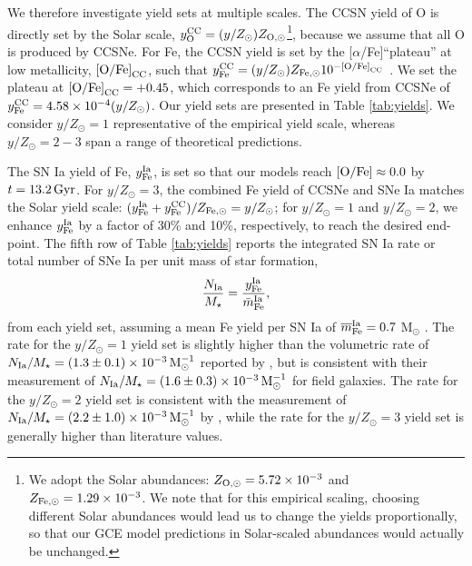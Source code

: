 \documentclass[twocolumn,twocolappendix,linenumbers]{aastex631}
\newcommand{\aFe}{[$\alpha$/Fe]\xspace}
\newcommand{\mathOFe}{{\rm [O/Fe]}}
\newcommand{\yZ}[1]{$y/Z_\odot=#1$}
\begin{document}
We therefore investigate yield sets at multiple scales. The CCSN yield of O is directly set by the Solar scale, $y_{\rm O}^{\rm CC}=(y/Z_\odot)Z_{\rm O,\odot}$\footnote{
    We adopt the \citet{asplund_chemical_2009} Solar abundances: $Z_{\rm O,\odot}=5.72\times10^{-3}$ and $Z_{\rm Fe,\odot}=1.29\times10^{-3}$. We note that for this empirical scaling, choosing different Solar abundances \citep[e.g.,][]{magg_observational_2022} would lead us to change the yields proportionally, so that our GCE model predictions in Solar-scaled abundances would actually be unchanged.
}, because we assume that all O is produced by CCSNe. For Fe, the CCSN yield is set by the \aFe ``plateau'' at low metallicity, $\mathOFe_{\rm CC}$, such that $y_{\rm Fe}^{\rm CC}=(y/Z_\odot) Z_{\rm Fe,\odot} 10^{-\mathOFe_{\rm CC}}$ \citep[for further discussion on the empirical yield scale and the CCSN plateau, see][]{weinberg_scale_2024}. We set the plateau at $\mathOFe_{\rm CC}=+0.45$, which corresponds to an Fe yield from CCSNe of $y_{\rm Fe}^{\rm CC}=4.58\times10^{-4}(y/Z_\odot)$. Our yield sets are presented in Table \ref{tab:yields}. We consider \yZ{1} representative of the empirical yield scale, whereas \yZ{2-3} span a range of theoretical predictions.

The SN Ia yield of Fe, $y_{\rm Fe}^{\rm Ia}$, is set so that our models reach $\mathOFe\approx0.0$ by $t=13.2\,{\rm Gyr}$. For \yZ{3}, the combined Fe yield of CCSNe and SNe Ia matches the Solar yield scale: $(y_{\rm Fe}^{\rm Ia}+y_{\rm Fe}^{\rm CC})/Z_{\rm Fe,\odot}=y/Z_\odot$; for \yZ{1} and \yZ{2}, we enhance $y_{\rm Fe}^{\rm Ia}$ by a factor of 30\% and 10\%, respectively, to reach the desired end-point. The fifth row of Table \ref{tab:yields} reports the integrated SN Ia rate or total number of SNe Ia per unit mass of star formation,
\begin{equation}
    \frac{N_{\rm Ia}}{M_\star} = \frac{y_{\rm Fe}^{\rm Ia}}{\bar m_{\rm Fe}^{\rm Ia}},
    \label{eq:snia-rate}
\end{equation}
from each yield set, assuming a mean Fe yield per SN Ia of $\overline m_{\rm Fe}^{\rm Ia}=0.7$ M$_\odot$ \citep{mazzali_common_2007,howell_effect_2009}. The rate for the \yZ{1} yield set is slightly higher than the volumetric rate of $N_{\rm Ia}/M_\star=(1.3\pm0.1)\times10^{-3}\,{\rm M}_\odot^{-1}$ reported by \citet{maoz_star_2017}, but is consistent with their measurement of $N_{\rm Ia}/M_\star=(1.6\pm0.3)\times10^{-3}\,{\rm M}_\odot^{-1}$ for field galaxies. The rate for the \yZ{2} yield set is consistent with the measurement of $N_{\rm Ia}/M_\star=(2.2\pm1.0)\times10^{-3}\,{\rm M}_\odot^{-1}$ by \citet{maoz_type-ia_2012}, while the rate for the \yZ{3} yield set is generally higher than literature values.
\end{document}
